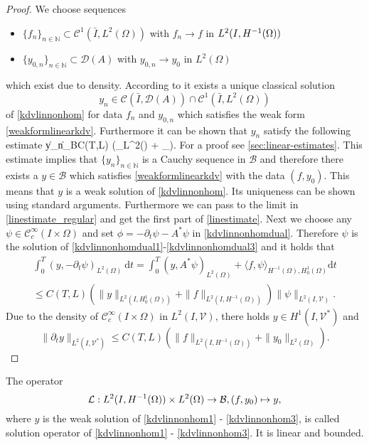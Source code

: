 \begin{proof}
We choose sequences
\begin{itemize}
  \item $\{f_n\}_{n\in\mathbb{N}}\subset\mathcal C^1(\bar I,L^2(\Omega))$ with $f_n\rightarrow f$ in $\Hm1$
  \item $\{y_{0,n}\}_{n\in\mathbb{N}}\subset\mathcal D(A)$ with $y_{0,n}\rightarrow y_0$ in $L^2(\Omega)$
\end{itemize}
which exist due to density. According to \cite[Part 2, Proposition 3.3]{bensoussan07} it exists a unique classical solution
\[y_n\in \mathcal C(\bar I,\mathcal D(A))\cap \mathcal C^1(\bar I,L^2(\Omega))\]
of \eqref{kdvlinnonhom} for data $f_n$ and $y_{0,n}$ which satisfies the weak form \eqref{weakformlinearkdv}. Furthermore it can be shown that $y_n$ satisfy the following estimate
\be
  \|y_n\|_{\mathcal B}\leq C(T,L) \left(_{L^{2}(\Omega)} + _{}\right).
  \label{linestimate_regular}
\ee
For a proof see \cref{sec:linear-estimates}.  This estimate implies that $\{y_n\}_{n\in \mathbb{N}}$ is a Cauchy sequence in $\mathcal B$ and therefore there exists a $y\in \mathcal B$ which satisfies \eqref{weakformlinearkdv} with the data $(f,y_0)$. This means that $y$ is a weak solution of \eqref{kdvlinnonhom}. Its uniqueness can be shown using standard arguments. Furthermore we can  pass to the limit in \eqref{linestimate_regular} and get the first part of \eqref{linestimate}. Next we choose any {\color{blue} $\psi\in \mathcal C_c^{\infty}(I\times \Omega)$} and set $\phi=-\partial_t\psi-A^*\psi$ in \eqref{kdvlinnonhomdual}. Therefore $\psi$ is the solution of \eqref{kdvlinnonhomdual1}-\eqref{kdvlinnonhomdual3} and it holds that
\begin{multline*}
\int_0^T(y,-\partial_t\psi)_{L^2(\Omega)}~\mathrm dt=\int_0^T(y,A^*\psi)_{L^2(\Omega)}+\langle f,\psi\rangle_{H^{-1}(\Omega),H^1_0(\Omega)}\mathrm dt\\
\leq C(T,L)\left(\|y\|_{L^2(I,H^1_0(\Omega))}+\|f\|_{L^2(I,H^{-1}(\Omega))}\right)\|\psi\|_{L^2(I,\mathcal V)}.
\end{multline*}
{\color{blue} Due to the density of $\mathcal C_c^\infty(I\times \Omega)$ in $L^2(I,\mathcal V)$, there holds $y\in H^1(I,\mathcal V^*)$ and
\[\|\partial_t y\|_{L^2(I,\mathcal V^*)}\leq C(T,L)\left(\|f\|_{L^2(I,H^{-1}(\Omega))}+\|y_0\|_{L^2(\Omega)}\right).\]}
\qquad\end{proof}

\begin{definition}\label{rmklinearoperator}
{\color{red}
The operator
\[
\mathcal{L}:\Hm1\times L^2(\Omega)\rightarrow \mathcal{B},(f,y_0) \mapsto y,
\]
where $y$ is the weak solution of \eqref{kdvlinnonhom1} - \eqref{kdvlinnonhom3}, is called solution operator of \eqref{kdvlinnonhom1} - \eqref{kdvlinnonhom3}. It is linear and bounded.}
\end{definition}
